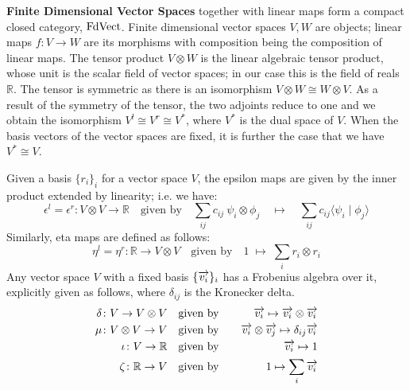 \medskip
\noindent
{\bf Finite Dimensional Vector Spaces} together with  linear maps  form a compact
closed category, $\mathrm{FdVect}$.  Finite dimensional
vector spaces $V, W$ are objects; linear maps $f
\colon V \to W$ are its morphisms with composition being the
composition of linear maps. The tensor product $V
\otimes W$ is the 
linear algebraic tensor product,
whose unit is the scalar
field of vector spaces; in our case this is the field of reals
$\mathbb{R}$.  The tensor is symmetric as there is an 
isomorphism $V \otimes W \cong W \otimes V$. As a result of the
symmetry of the tensor, the two adjoints reduce to one and we obtain the  isomorphism $V^l \cong V^r \cong V^*$, 
where $V^*$ is the dual space of $V$. When the
basis vectors of the vector spaces are fixed, it is further the case
that we have $V^* \cong V$.

%
Given a basis $\{r_i\}_i$ for a vector space $V$, the epsilon maps are
given by the inner product extended by linearity; i.e. we have:
\[
\epsilon^l  =  \epsilon^r \colon   V \otimes V \to \mathbb{R} \quad \mbox{given by} \quad
\sum_{ij} c_{ij} \ \psi_i \otimes \phi_j  \quad \mapsto \quad \sum_{ij} c_{ij} \langle \psi_i \mid \phi_j \rangle\]
Similarly, eta maps   are defined as follows:
\[
\eta^l = \eta^r \colon   \mathbb{R} \to V \otimes V
\quad \mbox{given by} \quad 
1 \; \mapsto \; \sum_i r_i \otimes r_i
\]
Any vector space $V$ with a fixed basis
$\{\overrightarrow{v_i}\}_i$ has a Frobenius algebra over it, explicitly given as follows, where $\delta_{ij}$ is the Kronecker delta.
\begin{eqnarray*}\label{eq:frob}
\delta  \colon V \to V \otimes V  & \quad \mbox{given by} \quad&  \overrightarrow{v_i} \mapsto \overrightarrow{v_i} \otimes \overrightarrow{v_i} \\
\mu \colon V \otimes V \to V  &\quad \mbox{given by} \quad & \overrightarrow{v_i} \otimes \overrightarrow{v_j} \mapsto 
\delta_{ij}\overrightarrow{v_i} \\
  \iota \colon V \to \mathbb{R} & \quad \mbox{given by} \quad&  \overrightarrow{v_i} \mapsto 1 \\
 \zeta \colon \mathbb{R} \to V  &\quad \mbox{given by} \quad& 1 \mapsto   \sum_i  \overrightarrow{v_i}  
\end{eqnarray*}


